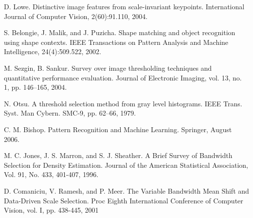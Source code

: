 \documentclass[a4paper,twocolumn, 10pt]{article}
\begin{document}
\begin{thebibliography}{19}
  D. Lowe. Distinctive image features from scale-invariant keypoints. International Journal of Computer Vision, 2(60):91.110, 2004.

  S. Belongie, J. Malik, and J. Puzicha. Shape matching and object recognition using shape contexts. IEEE Transactions on Pattern Analysis and Machine Intelligence, 24(4):509.522, 2002.

  M. Sezgin, B. Sankur. Survey over image thresholding techniques and quantitative performance evaluation. Journal of Electronic Imaging, vol. 13, no. 1, pp. 146–165, 2004.

  N. Otsu. A threshold selection method from gray level histograms. IEEE Trans. Syst. Man Cybern. SMC-9, pp. 62–66, 1979.

  C. M. Bishop. Pattern Recognition and Machine Learning. Springer, August 2006.

  M. C. Jones, J. S. Marron, and S. J. Sheather. A Brief Survey of Bandwidth Selection for Density Estimation. Journal of the American Statistical Association, Vol. 91, No. 433, 401-407, 1996.

  D. Comaniciu, V. Ramesh, and P. Meer. The Variable Bandwidth Mean Shift and Data-Driven Scale Selection. Proc Eighth International Conference of Computer Vision, vol. I, pp. 438-445, 2001

\end{thebibliography}
\end{document}
